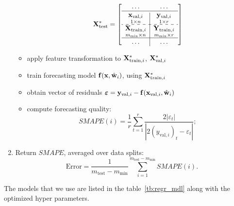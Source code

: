 \documentclass[conference]{IEEEtran}
\begin{document}
\begin{enumerate}[1)]
\begin{itemize}
 \[\bX^{*}_{\text{test}} = \left[\begin{array}{c|c}
 \dots & \dots \\
 \hline
 \underset{1{\times}n}{\bx_{\text{val}, i}} & \underset{1{\times}r}{\by_{\text{val}, i}}  \\
 \hdashline
 \underset{m_{\min}{\times}n}{\bX_{\text{train}, i}}  & \underset{m_{\min}{\times}r}{\bY_{\text{train}, i}} \\
 \hline
 \dots & \dots \\
 \end{array}\right]
 \]
\item apply feature transformation to ${\mathbf{X}}^{*}_{\text{train}, i}$, ${\mathbf{X}}^{*}_{\text{val}, i}$\;
\item  train forecasting model ${\mathbf{f}}({\mathbf{x}}, \hat{{\mathbf{w}}}_i)$, using ${\mathbf{X}}^{*}_{\text{train}, i}$\;
\item  obtain vector of residuals ${\boldsymbol{\varepsilon}}  = {\mathbf{y}}_{\text{val}, i} - {\mathbf{f}}({\mathbf{x}}_{\text{val}, i}, \hat{{\mathbf{w}}}_i)$\;
\item  compute forecasting quality:
  \[ {SMAPE}(i)  = \frac{1}{r} \sum_{t=1}^{r} \frac{2|\varepsilon_{t}|}{|2(y_{\text{val}, i})_t - \varepsilon_{t}|};\]
\end{itemize}
\item
  Return $SMAPE$, averaged over data splits:
  \[ \text{Error}  = \frac{1}{m_{\text{test}} - m_{\min}} \sum_{i=1}^{m_{\text{test}} - m_{\min}} {SMAPE}(i).\]
\end{enumerate}
The models that we use are listed in the table~\ref{tb:regr_mdl} along with the optimized hyper parameters.
\end{document}
